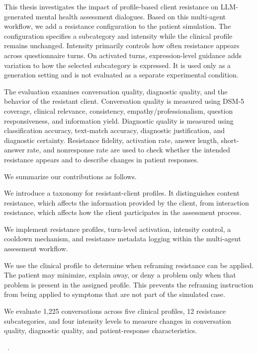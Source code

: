 This thesis investigates the impact of profile-based client resistance on LLM-generated mental health assessment dialogues. Based on this multi-agent workflow, we add a resistance configuration to the patient simulation. The configuration specifies a subcategory and intensity while the clinical profile remains unchanged. Intensity primarily controls how often resistance appears across questionnaire turns. On activated turns, expression-level guidance adds variation to how the selected subcategory is expressed. It is used only as a generation setting and is not evaluated as a separate experimental condition.

The evaluation examines conversation quality, diagnostic quality, and the behavior of the resistant client. Conversation quality is measured using DSM-5 coverage, clinical relevance, consistency, empathy/professionalism, question responsiveness, and information yield. Diagnostic quality is measured using classification accuracy, text-match accuracy, diagnostic justification, and diagnostic certainty. Resistance fidelity, activation rate, answer length, short-answer rate, and nonresponse rate are used to check whether the intended resistance appears and to describe changes in patient responses.

We summarize our contributions as follows.

\case{}
We introduce a taxonomy for resistant-client profiles. It distinguishes content resistance, which affects the information provided by the client, from interaction resistance, which affects how the client participates in the assessment process.

\case{}
We implement resistance profiles, turn-level activation, intensity control, a cooldown mechanism, and resistance metadata logging within the multi-agent assessment workflow.

\case{}
We use the clinical profile to determine when reframing resistance can be applied. The patient may minimize, explain away, or deny a problem only when that problem is present in the assigned profile. This prevents the reframing instruction from being applied to symptoms that are not part of the simulated case.

\case{}
We evaluate 1,225 conversations across five clinical profiles, 12 resistance subcategories, and four intensity levels to measure changes in conversation quality, diagnostic quality, and patient-response characteristics.

\iffalse
{}~\cite{Heiser-WebArticle2022}.


